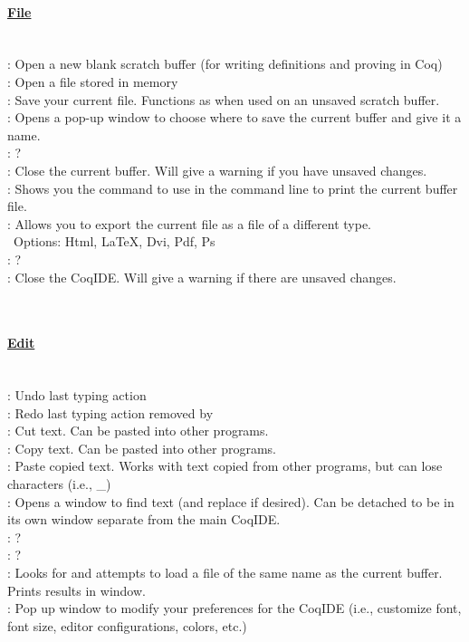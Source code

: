 
\paragraph{\underline{File}}
~\\
 : Open a new blank scratch buffer (for writing definitions and proving in Coq)
\\
 : Open a file stored in memory
\\
 : Save your current file. Functions as  when used on an unsaved scratch buffer. 
\\ 
 : Opens a pop-up window to choose where to save the current buffer and give it a name. 
\\
 : ? %
\\
 : Close the current buffer. Will give a warning if you have unsaved changes. 
\\
 : Shows you the command to use in the command line to print the current buffer file. 
\\
 : Allows you to export the current file as a file of a different type. 
	\\ \-\ \qquad Options: Html, LaTeX, Dvi, Pdf, Ps
\\
 : ? %
\\
 : Close the CoqIDE. Will give a warning if there are unsaved changes. 





~\\
\paragraph{\underline{Edit}}
~\\
 : Undo last typing action
\\
 : Redo last typing action removed by 
\\
 : Cut text. Can be pasted into other programs. 
\\
 : Copy text. Can be pasted into other programs.
\\ 
 : Paste copied text. Works with text copied from other programs, but can lose characters (i.e., \_)
\\
 : Opens a window to find text (and replace if desired). 
	Can be detached to be in its own window separate from the main CoqIDE. 
\\
 : ? 
\\
 : ? 
\\
 : Looks for and attempts to load a  file of the same name as the current buffer. 
	Prints results in  window. 
\\
 : Pop up window to modify your preferences for the CoqIDE 
(i.e., customize font, font size, editor configurations, colors, etc.)





